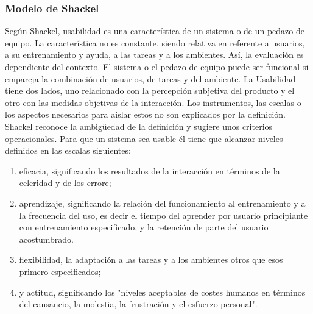 \documentclass[11pt]{article}
\begin{document}
\begin{normalsize}
\begin{flushleft}
		\subsubsection{Modelo de Shackel}
		\begin{itemize} 
		    Según Shackel, usabilidad es una característica de un sistema o de un pedazo de equipo. La característica no es constante, siendo relativa en referente a usuarios, a su entrenamiento y ayuda, a las tareas y a los ambientes. Así, la evaluación es dependiente del contexto. El sistema o el pedazo de equipo puede ser funcional si empareja la combinación de usuarios, de tareas y del ambiente. La Usabilidad tiene dos lados, uno relacionado con la percepción subjetiva del producto y el otro con las medidas objetivas de la interacción. Los instrumentos, las escalas o los aspectos necesarios para aislar estos no son explicados por la definición. Shackel reconoce la ambigüedad de la definición y sugiere unos criterios operacionales. Para que un sistema sea usable él tiene que alcanzar niveles definidos en las escalas siguientes:
		\end{itemize}
		\begin{itemize}
		    \begin{enumerate}
		    
		        \item eficacia, significando los resultados de la interacción en términos de la celeridad y de los errore;
		        \break
		        \item aprendizaje, significando la relación del funcionamiento al entrenamiento y a la frecuencia del uso, es decir el tiempo del aprender por usuario principiante con entrenamiento especificado, y la retención de parte del usuario acostumbrado.
		        \break
		        \item flexibilidad, la adaptación a las tareas y a los ambientes otros que esos primero especificados;
		        \break
		        \item y actitud, significando los "niveles aceptables de costes humanos en términos del cansancio, la molestia, la frustración y el esfuerzo personal".

		    \end{enumerate}
		\end{itemize}

\end{flushleft}
\end{normalsize}
\end{document}

